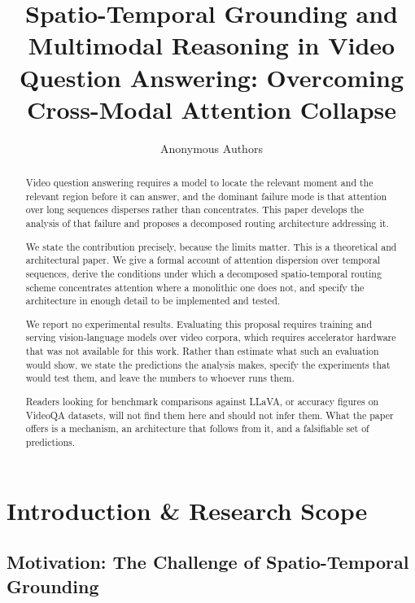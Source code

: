\documentclass{article}
\begin{document}
\title{Spatio-Temporal Grounding and Multimodal Reasoning in Video Question Answering: Overcoming Cross-Modal Attention Collapse}
\author{Anonymous Authors}
\maketitle

\begin{abstract}
Video question answering requires a model to locate the relevant moment and the relevant region before it can answer, and the dominant failure mode is that attention over long sequences disperses rather than concentrates. This paper develops the analysis of that failure and proposes a decomposed routing architecture addressing it.

We state the contribution precisely, because the limits matter. This is a theoretical and architectural paper. We give a formal account of attention dispersion over temporal sequences, derive the conditions under which a decomposed spatio-temporal routing scheme concentrates attention where a monolithic one does not, and specify the architecture in enough detail to be implemented and tested.

We report no experimental results. Evaluating this proposal requires training and serving vision-language models over video corpora, which requires accelerator hardware that was not available for this work. Rather than estimate what such an evaluation would show, we state the predictions the analysis makes, specify the experiments that would test them, and leave the numbers to whoever runs them.

Readers looking for benchmark comparisons against LLaVA, or accuracy figures on VideoQA datasets, will not find them here and should not infer them. What the paper offers is a mechanism, an architecture that follows from it, and a falsifiable set of predictions.
\end{abstract}






\section{Introduction \& Research Scope}



\subsection{Motivation: The Challenge of Spatio-Temporal Grounding}
\end{document}
